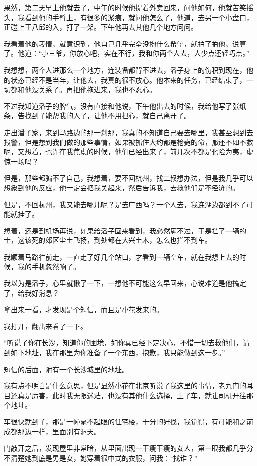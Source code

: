 果然，第二天早上他就去了，中午的时候他提着外卖回来，问他如何，他就苦笑摇头，我看到他的手臂上，有很多的淤痕，就问他怎么了，他道，去另一个小盘口，正碰上王八邱的入，打了一架。下午他再去其他几个地方问问。

我看着他的表情，就意识到，他自己几乎完全没抱什么希望，就拍了拍他，说算了。他道：“小三爷，你放心吧，实在不行，我和你两个人去，人少点还轻巧点。”

我想想，两个人进那么一个地方，连装备都背不进去，潘子身上的伤积到现在，他的状态已经不是当年，让他去，我真的很不放心。他本来的任务，已经结束了，一切都和他没关系了。再把他拖进来，我也不忍心。

不过我知道潘子的脾气，没有直接和他说，下午他出去的时候，我给他写了张纸条，告找到了能帮我的人了，让他不用担心，就自己离开了。

走出潘子家，来到马路边的那一刹那，我真的不知道自己要去哪里，我甚至想到去报警，但是想到我们做的那些事情，如果被抓住大约都是枪毙的命，那还不如不救呢，又想着，也许在我焦虑的时候，他们已经出来了，前几次不都是化险为夷，虚惊一场吗？

但是，那些都骗不了自己，我想着，要不回杭州，找二叔想办法，但是我几乎可以想象到他的反应，他一定会把我关起来，然后告诉我，去救他们是不经济的。

但是，不回杭州，我又能去哪儿呢？是去广西吗？一个人去，我连湖边都到不了可能就挂了。

想着，还是到机场再说，如果给潘子回来看到，我必然瞒不过，于是拦了一辆的士，这该死的郊区尘土飞扬，到处都在大兴土木，怎么也拦不到车。

我顺着马路往前走，一直走了好几个站口，才看到一辆空车，就在我想上去的时候，我的手机忽然响了。

我以为是潘子，心里就揪了一下，一想他不可能这么早回来，心说难道是他搞定了，给我好消息？

拿出来一看，才发现是个短信，而且是小花发来的。

我打开，翻出来看了一下。

“听说了你在长沙，知道你的困境，如你真已经下定决心，不惜一切去救他们，请到如下地址，我在那里为你准备了一个东西，抱歉，我只能做到这一步。”

短信的后面，附有一个长沙城里的地址。

我有点不明白是什么意思，但是显然小花在北京听说了我这里的事情，老九门的耳目还真是厉害，此时我无限迷茫，也没有其他什么选择，上了车，就让司机开往那个地址。

车很快就到了，那是一幢毫不起眼的住宅楼，十分的好找，我觉得，有可能和之前成都那边一样，里面别有洞天。

门敲开之后，发现屋里非常暗，从里面出现一干瘦干瘦的女人，第一眼我都几乎分不清楚她到底是男是女，她穿着很中式的衣服，问我：“找谁？”

